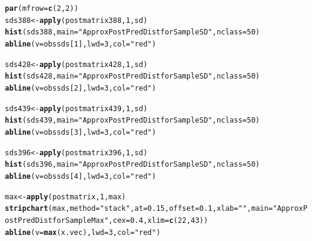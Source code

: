 \documentclass[12pt]{article}\usepackage[]{graphicx}\usepackage[]{color}
\makeatletter
\newcommand{\hlnum}[1]{\textcolor[rgb]{0.686,0.059,0.569}{#1}}%
\newcommand{\hlstr}[1]{\textcolor[rgb]{0.192,0.494,0.8}{#1}}%
\newcommand{\hlstd}[1]{\textcolor[rgb]{0.345,0.345,0.345}{#1}}%
\newcommand{\hlkwb}[1]{\textcolor[rgb]{0.69,0.353,0.396}{#1}}%
\newcommand{\hlkwc}[1]{\textcolor[rgb]{0.333,0.667,0.333}{#1}}%
\newcommand{\hlkwd}[1]{\textcolor[rgb]{0.737,0.353,0.396}{\textbf{#1}}}%
\newenvironment{kframe}{%
 \def\at@end@of@kframe{}%
 \ifinner\ifhmode%
  \def\at@end@of@kframe{\end{minipage}}%
  \begin{minipage}{\columnwidth}%
 \fi\fi%
 \def\FrameCommand##1{\hskip\@totalleftmargin \hskip-\fboxsep
 \colorbox{shadecolor}{##1}\hskip-\fboxsep
     \hskip-\linewidth \hskip-\@totalleftmargin \hskip\columnwidth}%
 \MakeFramed {\advance\hsize-\width
   \@totalleftmargin\z@ \linewidth\hsize
   \@setminipage}}%
 {\par\unskip\endMakeFramed%
 \at@end@of@kframe}
\newenvironment{knitrout}{}{} %
\makeatother
\begin{document}
\begin{knitrout}
\begin{kframe}
\begin{alltt}
\hlkwd{par}\hlstd{(}\hlkwc{mfrow}\hlstd{=}\hlkwd{c}\hlstd{(}\hlnum{2}\hlstd{,}\hlnum{2}\hlstd{))}
\hlstd{sds388} \hlkwb{<-} \hlkwd{apply}\hlstd{(postmatrix388,} \hlnum{1}\hlstd{, sd)}
\hlkwd{hist}\hlstd{(sds388,} \hlkwc{main}\hlstd{=}\hlstr{"Approx Post Pred Dist for Sample SD"}\hlstd{,} \hlkwc{nclass}\hlstd{=}\hlnum{50}\hlstd{)}
\hlkwd{abline}\hlstd{(}\hlkwc{v}\hlstd{=obssds[}\hlnum{1}\hlstd{],} \hlkwc{lwd}\hlstd{=}\hlnum{3}\hlstd{,} \hlkwc{col}\hlstd{=}\hlstr{"red"}\hlstd{)}

\hlstd{sds428} \hlkwb{<-} \hlkwd{apply}\hlstd{(postmatrix428,} \hlnum{1}\hlstd{, sd)}
\hlkwd{hist}\hlstd{(sds428,} \hlkwc{main}\hlstd{=}\hlstr{"Approx Post Pred Dist for Sample SD"}\hlstd{,} \hlkwc{nclass}\hlstd{=}\hlnum{50}\hlstd{)}
\hlkwd{abline}\hlstd{(}\hlkwc{v}\hlstd{=obssds[}\hlnum{2}\hlstd{],} \hlkwc{lwd}\hlstd{=}\hlnum{3}\hlstd{,} \hlkwc{col}\hlstd{=}\hlstr{"red"}\hlstd{)}

\hlstd{sds439} \hlkwb{<-} \hlkwd{apply}\hlstd{(postmatrix439,} \hlnum{1}\hlstd{, sd)}
\hlkwd{hist}\hlstd{(sds439,} \hlkwc{main}\hlstd{=}\hlstr{"Approx Post Pred Dist for Sample SD"}\hlstd{,} \hlkwc{nclass}\hlstd{=}\hlnum{50}\hlstd{)}
\hlkwd{abline}\hlstd{(}\hlkwc{v}\hlstd{=obssds[}\hlnum{3}\hlstd{],} \hlkwc{lwd}\hlstd{=}\hlnum{3}\hlstd{,} \hlkwc{col}\hlstd{=}\hlstr{"red"}\hlstd{)}

\hlstd{sds396} \hlkwb{<-} \hlkwd{apply}\hlstd{(postmatrix396,} \hlnum{1}\hlstd{, sd)}
\hlkwd{hist}\hlstd{(sds396,} \hlkwc{main}\hlstd{=}\hlstr{"Approx Post Pred Dist for Sample SD"}\hlstd{,} \hlkwc{nclass}\hlstd{=}\hlnum{50}\hlstd{)}
\hlkwd{abline}\hlstd{(}\hlkwc{v}\hlstd{=obssds[}\hlnum{4}\hlstd{],} \hlkwc{lwd}\hlstd{=}\hlnum{3}\hlstd{,} \hlkwc{col}\hlstd{=}\hlstr{"red"}\hlstd{)}
\end{alltt}
\end{kframe}
\end{knitrout}

\begin{knitrout}\footnotesize
{}\color{fgcolor}\begin{kframe}
\begin{alltt}
\hlstd{max} \hlkwb{<-} \hlkwd{apply}\hlstd{(postmatrix,} \hlnum{1}\hlstd{, max)}
\hlkwd{stripchart}\hlstd{(max,} \hlkwc{method}\hlstd{=}\hlstr{"stack"}\hlstd{,} \hlkwc{at}\hlstd{=}\hlnum{0.15}\hlstd{,} \hlkwc{offset}\hlstd{=}\hlnum{0.1}\hlstd{,} \hlkwc{xlab}\hlstd{=}\hlstr{""}\hlstd{,} \hlkwc{main}\hlstd{=}\hlstr{"Approx Post Pred Dist for Sample Max"}\hlstd{,} \hlkwc{cex}\hlstd{=}\hlnum{0.4}\hlstd{,} \hlkwc{xlim}\hlstd{=}\hlkwd{c}\hlstd{(}\hlnum{22}\hlstd{,} \hlnum{43}\hlstd{))}
\hlkwd{abline}\hlstd{(}\hlkwc{v}\hlstd{=}\hlkwd{max}\hlstd{(x.vec),} \hlkwc{lwd}\hlstd{=}\hlnum{3}\hlstd{,} \hlkwc{col}\hlstd{=}\hlstr{"red"}\hlstd{)}
\end{alltt}
\end{kframe}
\end{knitrout}
\end{document}
